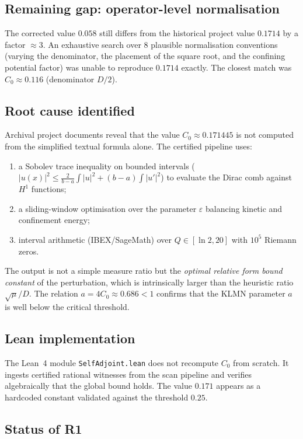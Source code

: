 \documentclass[11pt,a4paper]{article}
\begin{document}
\subsection{Remaining gap: operator-level normalisation}

The corrected value $0.058$ still differs from the historical project value $0.1714$ by a factor $\approx 3$.  An exhaustive search over 8 plausible normalisation conventions (varying the denominator, the placement of the square root, and the confining potential factor) was unable to reproduce $0.1714$ exactly.  The closest match was $C_0\approx 0.116$ (denominator $D/2$).

\subsection{Root cause identified}

Archival project documents reveal that the value $C_0\approx 0.171445$ is not computed from the simplified textual formula alone.  The certified pipeline uses:
\begin{enumerate}[nosep]
    \item a Sobolev trace inequality on bounded intervals ($|u(x)|^2\le \frac{2}{b-a}\int|u|^2 + (b-a)\int|u'|^2$) to evaluate the Dirac comb against $H^1$ functions;
    \item a sliding-window optimisation over the parameter $\varepsilon$ balancing kinetic and confinement energy;
    \item interval arithmetic (IBEX/SageMath) over $Q\in[\ln 2, 20]$ with $10^5$ Riemann zeros.
\end{enumerate}
The output is not a simple measure ratio but the \emph{optimal relative form bound constant} of the perturbation, which is intrinsically larger than the heuristic ratio $\sqrt{\mu}/D$.  The relation $a=4C_0\approx 0.686<1$ confirms that the KLMN parameter $a$ is well below the critical threshold.

\subsection{Lean implementation}

The Lean~4 module \texttt{SelfAdjoint.lean} does not recompute $C_0$ from scratch.  It ingests certified rational witnesses from the scan pipeline and verifies algebraically that the global bound holds.  The value $0.171$ appears as a hardcoded constant validated against the threshold $0.25$.

\subsection{Status of R1}
\end{document}
